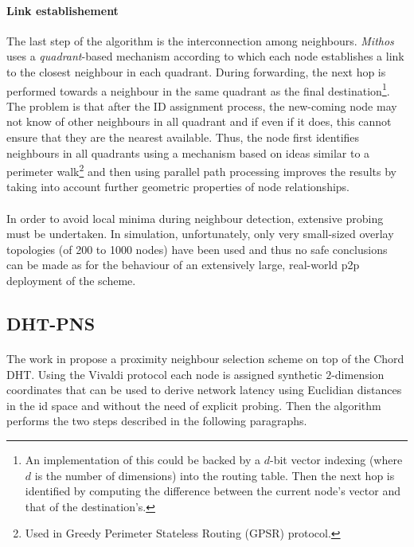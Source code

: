 \documentclass[a4paper,10pt]{article}
\begin{document}
\paragraph{Link establishement}
The last step of the algorithm is the interconnection among neighbours. \emph{Mithos} uses a \emph{quadrant}-based mechanism according to which each node establishes a link to the closest neighbour in each quadrant. During forwarding, the next hop is performed towards a neighbour in the same quadrant as the final destination\footnote{An implementation of this could be backed by a $d$-bit vector indexing (where $d$ is the number of dimensions) into the routing table. Then the next hop is identified by computing the difference between the current node's vector and that of the destination's.}. The problem is that after the ID assignment process, the new-coming node may not know of other neighbours in all quadrant and if even if it does, this cannot ensure that they are the nearest available. Thus, the node first identifies neighbours in all quadrants using a mechanism based on ideas similar to a perimeter walk\footnote{Used in Greedy Perimeter Stateless Routing (GPSR) protocol.} and then using parallel path processing improves the results by taking into account further geometric properties of node relationships.

\paragraph{}
In order to avoid local minima during neighbour detection, extensive probing must be undertaken. In simulation, unfortunately, only very small-sized overlay topologies (of 200 to 1000 nodes) have been used and thus no safe conclusions can be made as for the behaviour of an extensively large, real-world p2p deployment of the scheme. 

\subsection{DHT-PNS}

\paragraph{}
The work in \cite{hancong_pnsbased_2006} propose a proximity neighbour selection scheme on top of the Chord DHT. Using the Vivaldi protocol\cite{cox_vivaldi_2004} each node is assigned synthetic $2$-dimension coordinates that can be used to derive network latency using Euclidian distances in the id space and without the need of explicit probing. Then the algorithm performs the two steps described in the following paragraphs.
\end{document}
